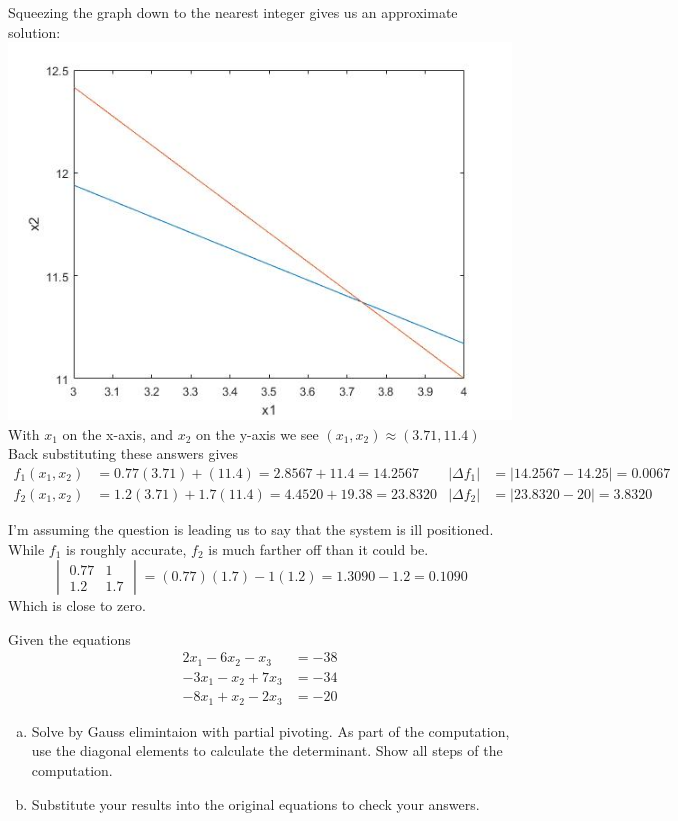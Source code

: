 \documentclass{article}
\begin{document}
Squeezing the graph down to the nearest integer gives us an approximate solution:\\
\includegraphics[width=\linewidth]{HW6-LineIntersect.jpg}
With $x_{1}$ on the x-axis, and $x_{2}$ on the y-axis we see $(x_{1},x_{2}) \approx (3.71,11.4)$
Back substituting these answers gives
\begin{align*}
f_{1}(x_{1},x_{2}) &= 0.77(3.71) + (11.4) = 2.8567 + 11.4 = \boxed{14.2567}
&	
\left| \Delta f_{1} \right| &= \left| 14.2567 -  14.25 \right| = 0.0067\\
f_{2}(x_{1},x_{2}) &= 1.2(3.71) + 1.7(11.4) = 4.4520 + 19.38 = \boxed{23.8320}
&
\left| \Delta f_{2} \right| &= \left| 23.8320 -  20 \right| = 3.8320
\end{align*}

I'm assuming the question is leading us to say that the system is ill positioned. While $f_{1}$ is roughly accurate, $f_{2}$ is much farther off than it could be.
\[
\begin{vmatrix}
0.77	&	1	\\
1.2		&	1.7
\end{vmatrix}
= (0.77)(1.7) - 1(1.2) = 1.3090 - 1.2 = \boxed{0.1090}
\]
Which is close to zero.

\setcounter{problem}{7}
\begin{problem}
Given the equations
\begin{align*}
2x_{1}	-6x_{2}	-x_{3}	&=	-38\\
-3x_{1}	-x_{2}	+7x_{3}	&=	-34\\
-8x_{1}	+x_{2}	-2x_{3}	&=	-20
\end{align*}
\begin{enumerate}[(a)]
\item Solve by Gauss elimintaion with partial pivoting. As part of the computation, use the diagonal elements to calculate the determinant. Show all steps of the computation.
\item Substitute your results into the original equations to check your answers.
\end{enumerate}
\end{problem}
\end{document}
